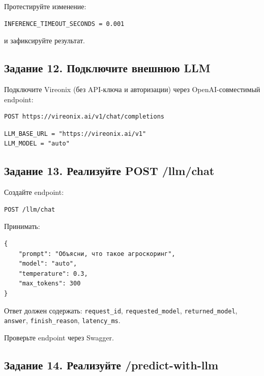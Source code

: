 \documentclass[12pt,a4paper]{article}
\begin{document}
Протестируйте изменение:

\begin{lstlisting}[caption={Тестовое значение таймаута}]
INFERENCE_TIMEOUT_SECONDS = 0.001
\end{lstlisting}

и зафиксируйте результат.

\subsection{Задание 12. Подключите внешнюю LLM}

Подключите Vireonix (без API-ключа и авторизации) через OpenAI-совместимый endpoint:

\begin{lstlisting}[caption={Endpoint LLM}]
POST https://vireonix.ai/v1/chat/completions
\end{lstlisting}

\begin{lstlisting}[caption={Параметры LLM}]
LLM_BASE_URL = "https://vireonix.ai/v1"
LLM_MODEL = "auto"
\end{lstlisting}

\subsection{Задание 13. Реализуйте POST /llm/chat}

Создайте endpoint:

\begin{lstlisting}[caption={Endpoint /llm/chat}]
POST /llm/chat
\end{lstlisting}

Принимать:

\begin{lstlisting}[caption={Тело запроса /llm/chat}]
{
    "prompt": "Объясни, что такое агроскоринг",
    "model": "auto",
    "temperature": 0.3,
    "max_tokens": 300
}
\end{lstlisting}

Ответ должен содержать: \texttt{request\_id}, \texttt{requested\_model}, \texttt{returned\_model}, \texttt{answer}, \texttt{finish\_reason}, \texttt{latency\_ms}.

Проверьте endpoint через Swagger.

\subsection{Задание 14. Реализуйте /predict-with-llm}
\end{document}
